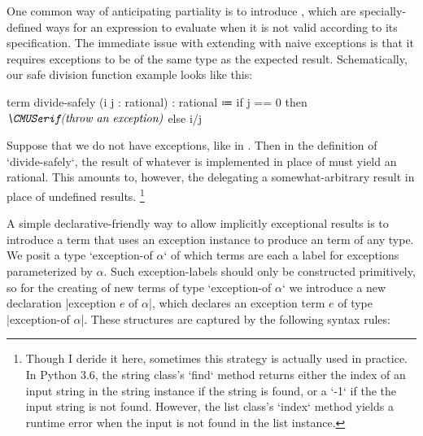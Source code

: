 One common way of anticipating partiality is to introduce ,
which are specially-defined ways for an expression to evaluate when it is not valid according to its specification.
The immediate issue with extending \LangA with naive exceptions is that it requires exceptions to be of the same type as the expected result.
Schematically, our safe division function example looks like this:
\begin{snippet}
term divide-safely (i j : rational) : rational
  ≔ if j == 0
      then $\normtextit{(throw an exception)}$
      else i/j
\end{snippet}
Suppose that we do not have exceptions, like in \LangA.
Then in the definition of {\code`divide-safely`,} the result of whatever is implemented in place of  must yield an rational.
This amounts to, however, the delegating a somewhat-arbitrary result in place of undefined results.%
\footnote{
  Though I deride it here, sometimes this strategy is actually used in practice. In Python 3.6, the string class's \code`find` method returns either the index of an input string in the string instance if the string is found, or a \code`-1` if the the input string is not found. However, the list class's \code`index` method yields a runtime error when the input is not found in the list instance.
}

A simple declarative-friendly way to allow implicitly exceptional results is to introduce a term that uses an exception instance to produce an  term of any type.
We posit a type \code`exception-of $α$` of which terms are each a label for exceptions parameterized by $α$.
Such exception-labels should only be constructed primitively, so for the creating of new terms of type \code`exception-of $α$` we introduce a new declaration \code|exception $e$ of $α$|,
which declares an exception term $e$ of type \code|exception-of $α$|.
These structures are captured by the following syntax rules:


